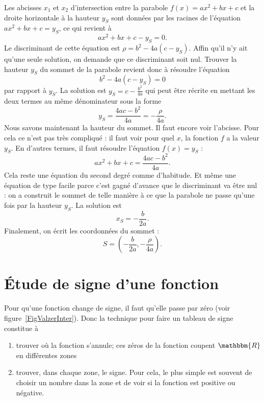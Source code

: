 \documentclass[a4paper,12pt]{book}
\newcommand{\eR}{\mathbbm{R}}
\theoremstyle{mes_exemples}	\newtheorem{exemple}[numtho]{Exemple}
\theoremstyle{mes_tho}
\begin{document}
Les abcisses $x_1$ et $x_2$ d'intersection entre la parabole $f(x)=ax^2+bx+c$ et la droite horizontale à la hauteur $y_S$ sont données par les racines de l'équation $ax^2+bx+c=y_S$, ce qui revient à
\[ 
  ax^2+bx+c-y_S=0.
\]
Le discriminant de cette équation est $\rho=b^2-4a(c-y_S)$. Affin qu'il n'y ait qu'une seule solution, on demande que ce discriminant soit nul. Trouver la hauteur $y_S$ du sommet de la parabole revient donc à résoudre l'équation
\[ 
  b^2-4a(c-y_S)=0
\]
par rapport à $y_S$. La solution est $y_S=c-\frac{ b^2 }{ 4a }$ qui peut être récrite en mettant les deux termes au même dénominateur sous la forme
\begin{equation}
	y_S=\frac{ 4ac-b^2 }{ 4a }=-\frac{ \rho }{ 4a }.
\end{equation}
Nous savons maintenant la hauteur du sommet. Il faut encore voir l'abcisse. Pour cela ce n'est pas très compliqué : il faut voir pour quel $x$, la fonction $f$ a la valeur $y_S$. En d'autres termes, il faut résoudre l'équation $f(x)=y_S$ :
\[ 
  ax^2+bx+c=\frac{ 4ac-b^2 }{ 4a }.
\]
Cela reste une équation du second degré comme d'habitude. Et même une équation de type facile parce c'est gagné d'avance que le discriminant va être nul : on a construit le sommet de telle manière à ce que la parabole ne passe qu'une fois par la hauteur $y_S$. La solution est 
\[ 
  x_S=-\frac{ b }{ 2a }.
\]
Finalement, on écrit les coordonnées du sommet :
\begin{equation}
S=\left( -\frac{ b }{ 2a },-\frac{ \rho }{ 4a } \right).
\end{equation}

%
%
 
\section{Étude de signe d'une fonction}

Pour qu'une fonction change de signe, il faut qu'elle passe par zéro (voir figure~\ref{FigValzerInter}). Donc la technique pour faire un tableau de signe constitue à
\begin{enumerate}
\item trouver où la fonction s'annule; ces zéros de la fonction coupent $\eR$ en différentes zones
\item trouver, dans chaque zone, le signe. Pour cela, le plus simple est souvent de choisir un nombre dans la zone et de voir si la fonction est positive ou négative.
\end{enumerate}
\end{document}
